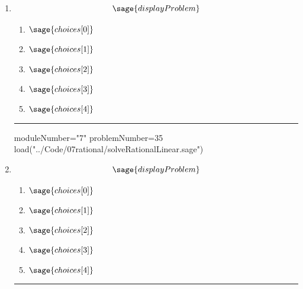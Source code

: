 \documentclass[14pt]{extbook}
\newcommand{\litem}[1]{\item#1\hspace*{-1cm}\rule{\textwidth}{0.4pt}}
\begin{document}
\begin{enumerate}
\litem{ 

   \[ \sage{displayProblem} \]

  	\begin{enumerate}[label=\Alph*.]
    \item \( \sage{choices[0]} \)
    \item \( \sage{choices[1]} \)
    \item \( \sage{choices[2]} \)
    \item \( \sage{choices[3]} \)
    \item \( \sage{choices[4]} \)
  	\end{enumerate}
  }
\begin{sagesilent}
moduleNumber="7"
problemNumber=35
load("../Code/07rational/solveRationalLinear.sage")
\end{sagesilent}

\litem{ 

   \[ \sage{displayProblem} \]

  	\begin{enumerate}[label=\Alph*.]
    \item \( \sage{choices[0]} \)
    \item \( \sage{choices[1]} \)
    \item \( \sage{choices[2]} \)
    \item \( \sage{choices[3]} \)
    \item \( \sage{choices[4]} \)
  	\end{enumerate}
  }

\end{enumerate}
\end{document}
